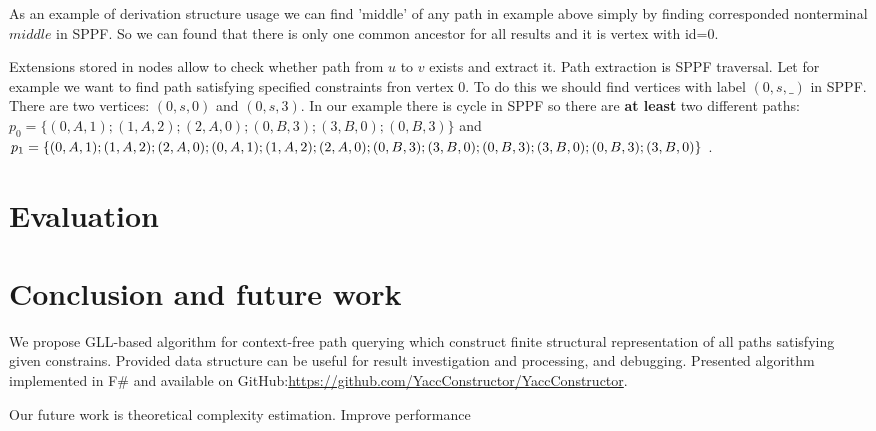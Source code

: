 \documentclass{sig-alternate} %
\begin{document}
As an example of derivation structure usage we can find 'middle' of any path in example above simply by finding corresponded nonterminal $middle$ in SPPF.
So we can found that there is only one common ancestor for all results and it is vertex with id=$0$. 

Extensions stored in nodes allow to check whether path from $u$ to $v$ exists and extract it. 
Path extraction is SPPF traversal. 
Let for example we want to find path satisfying specified constraints fron vertex $0$.
To do this we should find vertices with label $(0, s, \_)$ in SPPF. There are two vertices: $(0, s, 0)$ and $(0, s , 3)$.
In our example there is cycle in SPPF so there are \textbf{at least} two different paths: $p_0=\{(0,A,1);(1,A,2);(2,A,0);(0,B,3);(3,B,0);(0,B,3)\}$ and $p_1=\{(0,A,1);(1,A,2);(2,A,0);(0,A,1);(1,A,2);(2,A,0);\\ (0,B,3);(3,B,0);(0,B,3);(3,B,0);(0,B,3);(3,B,0)\}$ .

\section{Evaluation}

\section{Conclusion and future work}
We propose GLL-based algorithm for context-free path querying which construct finite structural representation of all paths satisfying given constrains.
Provided data structure can be useful for result investigation and processing, and debugging.
Presented algorithm implemented in F\# and available on GitHub:\url{https://github.com/YaccConstructor/YaccConstructor}.

Our future work is theoretical complexity estimation.
Improve performance~\cite{FGLL}






\end{document}
